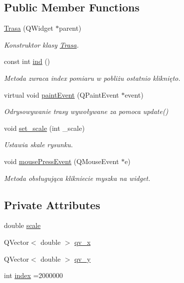 \subsection*{Public Member Functions}
\begin{DoxyCompactItemize}
\item 
\hyperlink{class_trasa_a00694745a2bbcf0b6c449450073406ff}{Trasa} (Q\+Widget $\ast$parent)
\begin{DoxyCompactList}\small\item\em Konstruktor klasy \hyperlink{class_trasa}{Trasa}. \end{DoxyCompactList}\item 
const int \hyperlink{class_trasa_ad1cecf9d36222a654d3b2f10d76dd1c3}{ind} ()
\begin{DoxyCompactList}\small\item\em Metoda zwraca index pomiaru w pobliżu ostatnio kliknięto. \end{DoxyCompactList}\item 
virtual void \hyperlink{class_trasa_a369eb849159b2673663784bab2655964}{paint\+Event} (Q\+Paint\+Event $\ast$event)
\begin{DoxyCompactList}\small\item\em Odrysowywanie trasy wywoływane za pomoca update() \end{DoxyCompactList}\item 
void \hyperlink{class_trasa_abd50f0fb27911e6f85b2654de5ec68b5}{set\+\_\+scale} (int \+\_\+scale)
\begin{DoxyCompactList}\small\item\em Ustawia skale rysunku. \end{DoxyCompactList}\item 
void \hyperlink{class_trasa_a848df9d4b50d279f304a6a19411ab9ba}{mouse\+Press\+Event} (Q\+Mouse\+Event $\ast$e)
\begin{DoxyCompactList}\small\item\em Metoda obsługująca klikniecie myszka na widget. \end{DoxyCompactList}\end{DoxyCompactItemize}
\subsection*{Private Attributes}
\begin{DoxyCompactItemize}
\item 
double \hyperlink{class_trasa_a4bc5fca0e6c9e2d18cfbd7b0ee0a6c47}{scale}
\item 
Q\+Vector$<$ double $>$ \hyperlink{class_trasa_a41a6b053dd05d57c1ca3e0c1c26bd504}{qv\+\_\+x}
\item 
Q\+Vector$<$ double $>$ \hyperlink{class_trasa_a232930dbf4c8396b9251c258813fa0c1}{qv\+\_\+y}
\item 
int \hyperlink{class_trasa_adc9ed75ed0b4a2669128ef2d7ffaf150}{index} =2000000
\end{DoxyCompactItemize}


